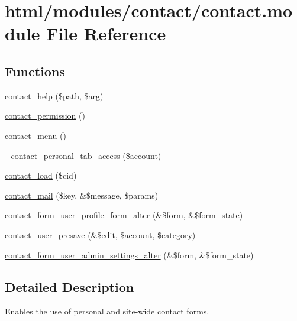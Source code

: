\hypertarget{contact_8module}{
\section{html/modules/contact/contact.module File Reference}
\label{contact_8module}
}
\subsection*{Functions}
\begin{DoxyCompactItemize}
\item 
\hyperlink{contact_8module_a9cef8798ccd1c2adf779f8333dab9f02}{contact\_\-help} (\$path, \$arg)
\item 
\hyperlink{contact_8module_a3c4458c442dae246cadee924683670fb}{contact\_\-permission} ()
\item 
\hyperlink{contact_8module_aa553b7cf1c3901cce1c2a8c4a04c5212}{contact\_\-menu} ()
\item 
\hyperlink{contact_8module_a24a9029fc8494d445ef1c6f38868b521}{\_\-contact\_\-personal\_\-tab\_\-access} (\$account)
\item 
\hyperlink{contact_8module_a132b73d26638a6cf021bc98bf26ef811}{contact\_\-load} (\$cid)
\item 
\hyperlink{contact_8module_a1d55f88a983d634aa400860e2917f24a}{contact\_\-mail} (\$key, \&\$message, \$params)
\item 
\hyperlink{contact_8module_a00ac03d08ff9477e1a06f250d33b28b1}{contact\_\-form\_\-user\_\-profile\_\-form\_\-alter} (\&\$form, \&\$form\_\-state)
\item 
\hyperlink{contact_8module_aacb579e6af028d48e3becd45574b09f1}{contact\_\-user\_\-presave} (\&\$edit, \$account, \$category)
\item 
\hyperlink{contact_8module_a6fcc27390159b5c3ae4794e3c18e3bd5}{contact\_\-form\_\-user\_\-admin\_\-settings\_\-alter} (\&\$form, \&\$form\_\-state)
\end{DoxyCompactItemize}


\subsection{Detailed Description}
Enables the use of personal and site-\/wide contact forms. 

